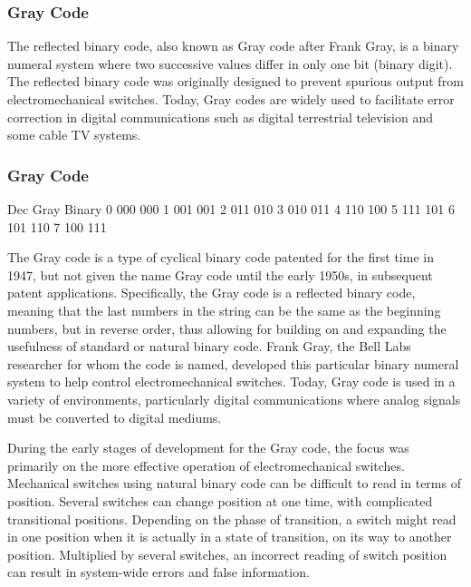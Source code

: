 \begin{frame}
\frametitle{Gray Code}
\Large

The reflected binary code, also known as Gray code after Frank Gray, is a binary numeral 
system where two successive values differ in only one bit (binary digit). The reflected binary code was originally designed to prevent spurious output from electromechanical switches. Today, Gray codes are widely used to facilitate error correction in digital communications such as digital terrestrial 
television and some cable TV systems.
\end{frame}

\begin{frame}
\frametitle{Gray Code}
\Large

Dec  Gray   Binary
 0   000    000
 1   001    001
 2   011    010
 3   010    011
 4   110    100
 5   111    101
 6   101    110
 7   100    111

\end{frame}
The Gray code is a type of cyclical binary code patented for the first time in 1947, but not given the name Gray code until the early 1950s, in subsequent patent applications. Specifically, the Gray code is a reflected binary code, meaning that the last numbers in the string can be the same as the beginning numbers, but in reverse order, thus allowing for building on and expanding the usefulness of standard or natural binary code. Frank Gray, the Bell Labs researcher for whom the code is named, developed this particular binary numeral system to help control electromechanical switches. Today, Gray code is used in a variety of environments, particularly digital communications where analog signals must be converted to digital mediums.

During the early stages of development for the Gray code, the focus was primarily on the more effective operation of electromechanical switches. Mechanical switches using natural binary code can be difficult to read in terms of position. Several switches can change position at one time, with complicated transitional positions. Depending on the phase of transition, a switch might read in one position when it is actually in a state of transition, on its way to another position. Multiplied by several switches, an incorrect reading of switch position can result in system-wide errors and false information.


